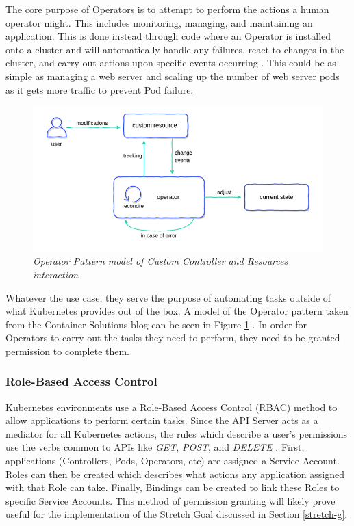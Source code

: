 \documentclass{article}
\begin{document}
The core purpose of Operators is to attempt to perform the actions a human operator might. This includes monitoring, managing, and maintaining an application. This is done instead through code where an Operator is installed onto a cluster and will automatically handle any failures, react to changes in the cluster, and carry out actions upon specific events occurring \cite{operator-pattern}. This could be as simple as managing a web server and scaling up the number of web server pods as it gets more traffic to prevent Pod failure.
\begin{figure}[H]
    \centering
    \includegraphics[width=160mm]{tech/operator-pattern.png}
    \caption{\emph{Operator Pattern model of Custom Controller and Resources interaction}}
    \label{op-pat}
\end{figure}

Whatever the use case, they serve the purpose of automating tasks outside of what Kubernetes provides out of the box. A model of the Operator pattern taken from the Container Solutions blog can be seen in Figure \ref{op-pat} \cite{op-pat-blog}. In order for Operators to carry out the tasks they need to perform, they need to be granted permission to complete them. 



\subsubsection{Role-Based Access Control}

Kubernetes environments use a Role-Based Access Control (RBAC) method to allow applications to perform certain tasks. Since the API Server acts as a mediator for all Kubernetes actions, the rules which describe a user's permissions use the verbs common to APIs like \emph{GET}, \emph{POST}, and \emph{DELETE} \cite{rbac}. First, applications (Controllers, Pods, Operators, etc) are assigned a Service Account. Roles can then be created which describes what actions any application assigned with that Role can take. Finally, Bindings can be created to link these Roles to specific Service Accounts. This method of permission granting will likely prove useful for the implementation of the Stretch Goal discussed in Section \ref{stretch-g}.
\end{document}
